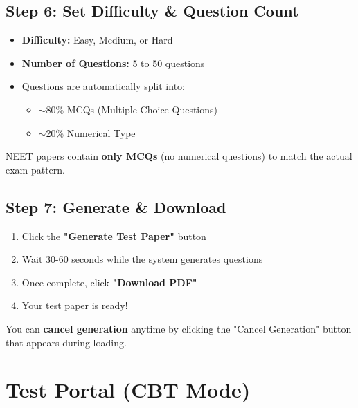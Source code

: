 \documentclass[11pt,a4paper]{article}
\begin{document}
\subsection{Step 6: Set Difficulty \& Question Count}

\begin{itemize}[leftmargin=*]
    \item \textbf{Difficulty:} Easy, Medium, or Hard
    \item \textbf{Number of Questions:} 5 to 50 questions
    \item Questions are automatically split into:
    \begin{itemize}
        \item $\sim$80\% MCQs (Multiple Choice Questions)
        \item $\sim$20\% Numerical Type
    \end{itemize}
\end{itemize}

\begin{tcolorbox}[warningbox]
NEET papers contain \textbf{only MCQs} (no numerical questions) to match the actual exam pattern.
\end{tcolorbox}

\subsection{Step 7: Generate \& Download}

\begin{enumerate}[leftmargin=*]
    \item Click the \textbf{"Generate Test Paper"} button
    \item Wait 30-60 seconds while the system generates questions
    \item Once complete, click \textbf{"Download PDF"}
    \item Your test paper is ready!
\end{enumerate}

\begin{tcolorbox}[tipbox]
You can \textbf{cancel generation} anytime by clicking the "Cancel Generation" button that appears during loading.
\end{tcolorbox}

\section{Test Portal (CBT Mode)}
\end{document}
